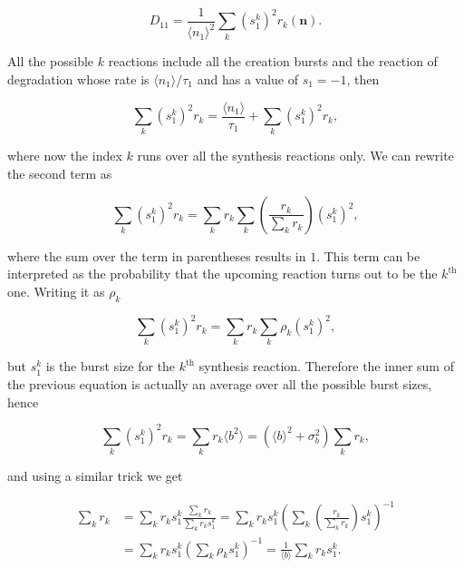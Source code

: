 \begin{equation}
  \label{eq:mrnab1}
  D_{11}=\frac{1}{\langle n_1\rangle^2}\sum_k(s_1^k)^2r_k(\mathbf{n}).
\end{equation}

All the possible $k$ reactions include all the creation bursts and the reaction of degradation whose rate is $\langle n_1 \rangle/\tau_1$ and has a value of $s_1=-1$, then

\begin{equation}
  \label{eq:mrnab2}
  \sum_k(s_1^k)^2r_k = \frac{\langle n_1 \rangle}{\tau_1} + \sum_{k}(s_1^{k})^2r_{k},
\end{equation}

where now the index $k$ runs over all the synthesis reactions only. We can rewrite the second term as

\begin{equation*}
  \sum_k(s_1^k)^2r_k=\sum_kr_k\sum_k\left(\frac{r_k}{\sum_kr_k}\right)(s_1^k)^2,
\end{equation*}

where the sum over the term in parentheses results in $1$. This term can be interpreted as the probability that the upcoming reaction turns out to be the $k^{\text{th}}$ one. Writing it as $\rho_k$

\begin{equation*}
  \sum_k(s_1^k)^2r_k=\sum_kr_k\sum_k\rho_k(s_1^k)^2,
\end{equation*}

but $s_1^k$ is the burst size for the $k^{\text{th}}$ synthesis reaction. Therefore the inner sum of the previous equation is actually an average over all the possible burst sizes, hence

\begin{equation}
  \label{eq:mrnab4}
  \sum_k(s_1^k)^2r_k=\sum_kr_k\langle b^2 \rangle=\left(\langle b\rangle^2+\sigma_b^2\right)\sum_kr_k,
\end{equation}

and using a similar trick we get

\begin{equation*}
  \begin{split}
    \sum_kr_k&=\sum_kr_ks_1^k\frac{\sum_kr_k}{\sum_kr_ks_1^k}=\sum_kr_ks_1^k\left(\sum_k\left(\frac{r_k}{\sum_kr_k}\right)s_1^k\right)^{-1}\\
    &=\sum_kr_ks_1^k\left(\sum_k\rho_ks_1^k\right)^{-1}=\frac{1}{\langle b\rangle}\sum_kr_ks_1^k.
  \end{split}
\end{equation*}

